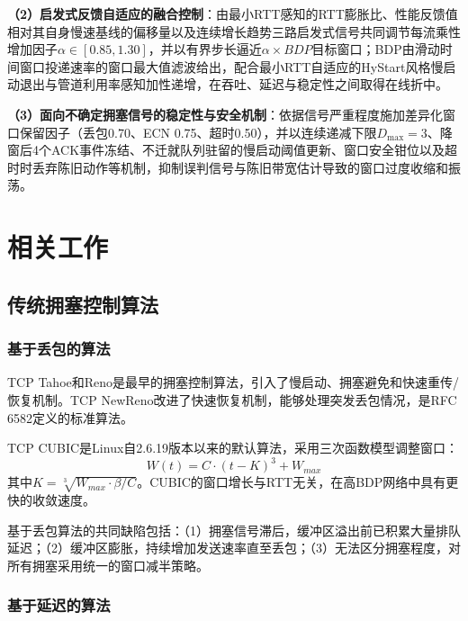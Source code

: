 \documentclass[10pt,twocolumn]{article}
\begin{document}
\textbf{（2）启发式反馈自适应的融合控制}：由最小RTT感知的RTT膨胀比、性能反馈值相对其自身慢速基线的偏移量以及连续增长趋势三路启发式信号共同调节每流乘性增加因子$\alpha \in [0.85, 1.30]$，并以有界步长逼近$\alpha \times BDP$目标窗口；BDP由滑动时间窗口投递速率的窗口最大值滤波给出，配合最小RTT自适应的HyStart风格慢启动退出与管道利用率感知加性递增，在吞吐、延迟与稳定性之间取得在线折中。

\textbf{（3）面向不确定拥塞信号的稳定性与安全机制}：依据信号严重程度施加差异化窗口保留因子（丢包0.70、ECN 0.75、超时0.50），并以连续递减下限$D_{\max}=3$、降窗后4个ACK事件冻结、不迁就队列驻留的慢启动阈值更新、窗口安全钳位以及超时时丢弃陈旧动作等机制，抑制误判信号与陈旧带宽估计导致的窗口过度收缩和振荡。


\section{相关工作}

\subsection{传统拥塞控制算法}

\subsubsection{基于丢包的算法}

TCP Tahoe和Reno是最早的拥塞控制算法\cite{jacobson1988}，引入了慢启动、拥塞避免和快速重传/恢复机制。TCP NewReno\cite{newreno}改进了快速恢复机制，能够处理突发丢包情况，是RFC 6582定义的标准算法。

TCP CUBIC\cite{cubic}是Linux自2.6.19版本以来的默认算法，采用三次函数模型调整窗口：
\begin{equation}
W(t) = C \cdot (t - K)^3 + W_{max}
\end{equation}
其中$K = \sqrt[3]{W_{max} \cdot \beta / C}$。CUBIC的窗口增长与RTT无关，在高BDP网络中具有更快的收敛速度。

基于丢包算法的共同缺陷包括：（1）拥塞信号滞后，缓冲区溢出前已积累大量排队延迟；（2）缓冲区膨胀，持续增加发送速率直至丢包；（3）无法区分拥塞程度，对所有拥塞采用统一的窗口减半策略。

\subsubsection{基于延迟的算法}
\end{document}
